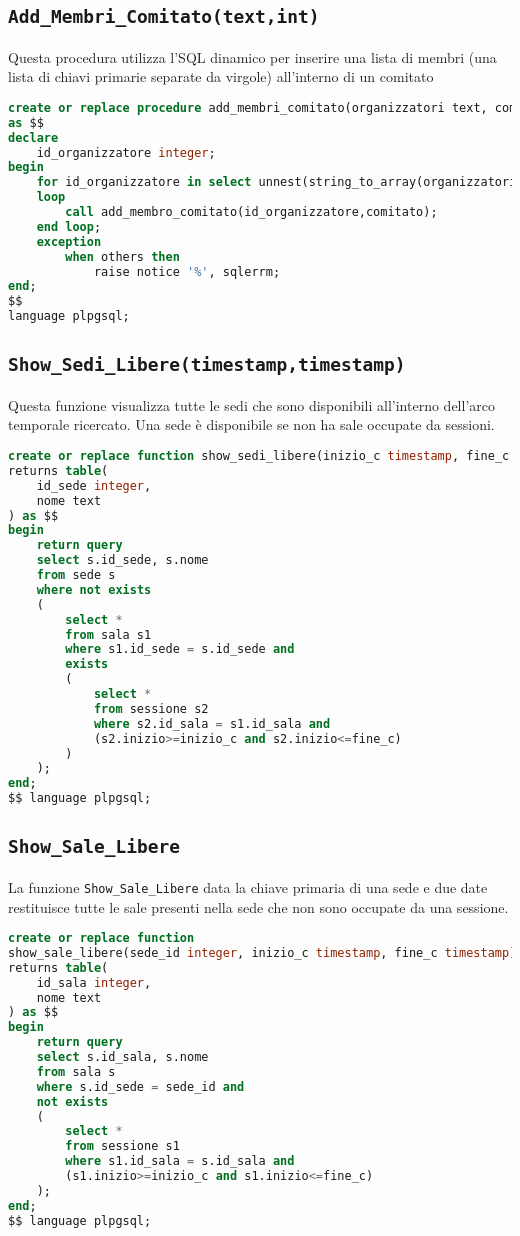 \subsection{\texttt{Add\_Membri\_Comitato(text,int)}}
Questa procedura utilizza l'SQL dinamico per inserire una lista di membri (una lista di chiavi primarie separate da virgole) all'interno di un comitato
\begin{lstlisting}[language=SQL,style=mystyle]
create or replace procedure add_membri_comitato(organizzatori text, comitato integer)
as $$
declare
    id_organizzatore integer;
begin
    for id_organizzatore in select unnest(string_to_array(organizzatori,','))::integer
    loop
        call add_membro_comitato(id_organizzatore,comitato);
    end loop;
    exception
        when others then
            raise notice '%', sqlerrm;
end;
$$
language plpgsql;


\end{lstlisting}
\subsection{\texttt{Show\_Sedi\_Libere(timestamp,timestamp)}}
Questa funzione visualizza tutte le sedi che sono disponibili all'interno dell'arco temporale ricercato. Una sede è disponibile se non ha sale occupate da sessioni.
\begin{lstlisting}[language=SQL,style=mystyle]
create or replace function show_sedi_libere(inizio_c timestamp, fine_c timestamp)
returns table(
    id_sede integer,
    nome text
) as $$
begin
    return query
    select s.id_sede, s.nome
    from sede s
    where not exists
    (
        select *
        from sala s1
        where s1.id_sede = s.id_sede and
        exists
        (
            select *
            from sessione s2
            where s2.id_sala = s1.id_sala and
            (s2.inizio>=inizio_c and s2.inizio<=fine_c)
        )
    );
end;
$$ language plpgsql;
\end{lstlisting}
\subsection{\texttt{Show\_Sale\_Libere}}
La funzione \texttt{Show\_Sale\_Libere} data la chiave primaria di una sede e due date restituisce tutte le sale presenti nella sede che non sono occupate da una sessione.
\begin{lstlisting}[language=SQL,style=mystyle]
create or replace function 
show_sale_libere(sede_id integer, inizio_c timestamp, fine_c timestamp)
returns table(
    id_sala integer,
    nome text
) as $$
begin
    return query
    select s.id_sala, s.nome
    from sala s
    where s.id_sede = sede_id and
    not exists
    (
        select *
        from sessione s1
        where s1.id_sala = s.id_sala and
        (s1.inizio>=inizio_c and s1.inizio<=fine_c)
    );
end;
$$ language plpgsql;
\end{lstlisting}